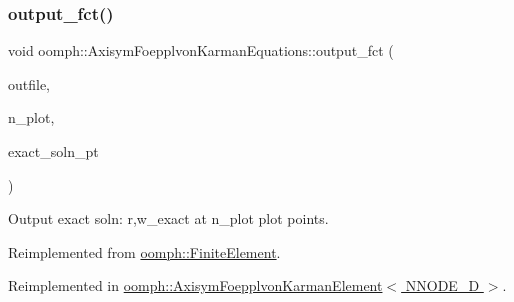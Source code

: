 \mbox{\label{classoomph_1_1AxisymFoepplvonKarmanEquations_aae7ed0c9ae0e1a1e2656534807a24527}} 
\subsubsection{\texorpdfstring{output\+\_\+fct()}{output\_fct()}\hspace{0.1cm}{\footnotesize\ttfamily [1/4]}}
{\footnotesize\ttfamily void oomph\+::\+Axisym\+Foepplvon\+Karman\+Equations\+::output\+\_\+fct (\begin{DoxyParamCaption}\item[{std\+::ostream \&}]{outfile,  }\item[{const unsigned \&}]{n\+\_\+plot,  }\item[{\hyperlink{classoomph_1_1FiniteElement_a690fd33af26cc3e84f39bba6d5a85202}{Finite\+Element\+::\+Steady\+Exact\+Solution\+Fct\+Pt}}]{exact\+\_\+soln\+\_\+pt }\end{DoxyParamCaption})\hspace{0.3cm}{\ttfamily [virtual]}}



Output exact soln\+: r,w\+\_\+exact at n\+\_\+plot plot points. 



Reimplemented from \hyperlink{classoomph_1_1FiniteElement_a22b695c714f60ee6cd145be348042035}{oomph\+::\+Finite\+Element}.



Reimplemented in \hyperlink{classoomph_1_1AxisymFoepplvonKarmanElement_aee745c3439aa18c82ddbe8b90fade1c0}{oomph\+::\+Axisym\+Foepplvon\+Karman\+Element$<$ N\+N\+O\+D\+E\+\_\+D $>$}.

\mbox{\label{classoomph_1_1AxisymFoepplvonKarmanEquations_a14d84273c5e7a3cdec8fb9b228d675c3}} 
